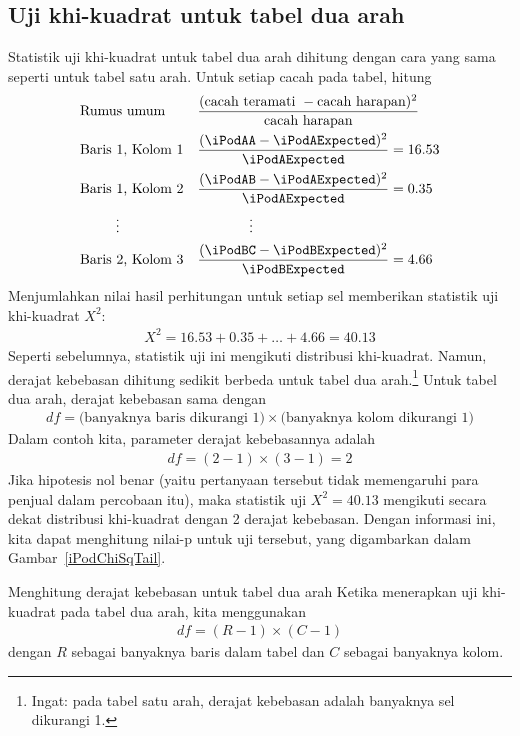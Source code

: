 \subsection{Uji khi-kuadrat untuk tabel dua arah}

Statistik uji khi-kuadrat untuk tabel dua arah dihitung
dengan cara yang sama seperti untuk tabel satu arah.
Untuk setiap cacah pada tabel, hitung
\begin{align*}
&\text{Rumus umum} &&
    \frac{(\text{cacah teramati } - \text{cacah harapan})^2}
        {\text{cacah harapan}} \\
&\text{Baris 1, Kolom 1} &&
    \frac{(\iPodAA - \iPodAExpected)^2}{\iPodAExpected} = 16.53 \\
&\text{Baris 1, Kolom 2} &&
    \frac{(\iPodAB - \iPodAExpected)^2}{\iPodAExpected} = 0.35 \\
& \hspace{9mm}\vdots &&
    \hspace{13mm}\vdots \\
&\text{Baris 2, Kolom 3} &&
    \frac{(\iPodBC - \iPodBExpected)^2}{\iPodBExpected} = 4.66
\end{align*}
Menjumlahkan nilai hasil perhitungan untuk setiap sel memberikan statistik uji khi-kuadrat $X^2$:
\begin{align*}
X^2 = 16.53 + 0.35 + \dots + 4.66 = 40.13
\end{align*}
Seperti sebelumnya, statistik uji ini mengikuti distribusi khi-kuadrat. Namun, derajat kebebasan dihitung sedikit berbeda untuk tabel dua arah.\footnote{Ingat: pada tabel satu arah, derajat kebebasan adalah banyaknya sel dikurangi 1.} Untuk tabel dua arah, derajat kebebasan sama dengan
\begin{align*}
df = \text{(banyaknya baris dikurangi 1)}\times \text{(banyaknya kolom dikurangi 1)}
\end{align*}
Dalam contoh kita, parameter derajat kebebasannya adalah
\begin{align*}
df = (2-1)\times (3-1) = 2
\end{align*}
Jika hipotesis nol benar
(yaitu pertanyaan tersebut tidak memengaruhi para penjual dalam
    percobaan itu),
maka statistik uji $X^2 = 40.13$ mengikuti secara dekat
distribusi khi-kuadrat dengan 2 derajat kebebasan.
Dengan informasi ini, kita dapat menghitung nilai-p untuk
uji tersebut, yang digambarkan dalam
Gambar~\ref{iPodChiSqTail}.

\begin{onebox}{Menghitung derajat kebebasan untuk tabel dua arah}
  Ketika menerapkan uji khi-kuadrat pada tabel dua arah,
  kita menggunakan
  \begin{align*}
  df = (R-1)\times (C-1)
  \end{align*}
  dengan $R$ sebagai banyaknya baris dalam tabel
  dan $C$ sebagai banyaknya kolom.
\end{onebox}

